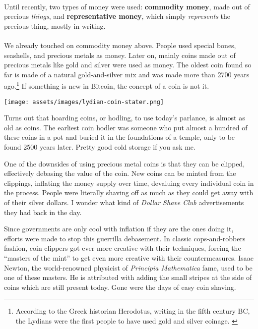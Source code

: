 \paragraph{}
Until recently, two types of money were used: \textbf{commodity money}, made
out of precious \textit{things}, and \textbf{representative money}, which simply
\textit{represents} the precious thing, mostly in writing.

\paragraph{}
We already touched on commodity money above. People used special bones,
seashells, and precious metals as money. Later on, mainly coins made out of
precious metals like gold and silver were used as money. The oldest coin found
so far is made of a natural gold-and-silver mix and was made more than 2700
years ago.\footnote{According to the Greek historian Herodotus, writing in the
fifth century BC, the Lydians were the first people to have used gold and silver
coinage. \cite{coinage-origins}} If something is new in Bitcoin, the concept of
a coin is not it.

\newpage

\begin{center}
  \centering
  \texttt{[image: assets/images/lydian-coin-stater.png]}
  \label{fig:lydian-coin-stater}
\end{center}

Turns out that hoarding coins, or hodling, to use today's parlance, is
almost as old as coins. The earliest coin hodler was someone who put
almost a hundred of these coins in a pot and buried it in the
foundations of a temple, only to be found 2500 years later. Pretty good
cold storage if you ask me.

One of the downsides of using precious metal coins is that they can be
clipped, effectively debasing the value of the coin. New coins can be
minted from the clippings, inflating the money supply over time,
devaluing every individual coin in the process. People were literally
shaving off as much as they could get away with of their silver dollars.
I wonder what kind of \textit{Dollar Shave Club} advertisements they had back
in the day.

Since governments are only cool with inflation if they are the ones
doing it, efforts were made to stop this guerrilla debasement. In
classic cops-and-robbers fashion, coin clippers got ever more creative
with their techniques, forcing the \enquote{masters of the mint} to get even
more creative with their countermeasures. Isaac Newton, the
world-renowned physicist of \textit{Principia Mathematica} fame, used to be one
of these masters. He is attributed with adding the small stripes at the
side of coins which are still present today. Gone were the days of easy
coin shaving.

